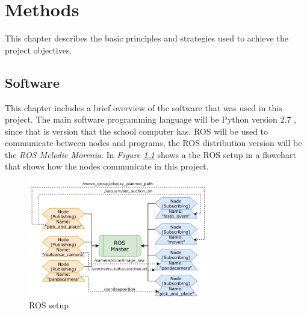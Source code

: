 \chapter{Methods}
This chapter describes the basic principles and strategies used to achieve the project objectives. 
\section{Software}

This chapter includes a brief overview of the software that was used in this project. The main software programming language will be Python version 2.7 \cite{noauthor_python_nodate}, since that is version that the school computer has. ROS will be used to communicate between nodes and programs, the ROS distribution version will be the \textit{ROS Melodic Morenia}\cite{noauthor_melodic_nodate}. In \textit{Figure \ref{fig:roswork}} shows a the ROS setup in a flowchart that shows how the nodes communicate in this project.
\begin{figure}[h]
    \centering
    \includegraphics[width=0.7\textwidth]{graphics/ros.pdf}
    \caption{ROS setup}
    \label{fig:roswork}
\end{figure}


